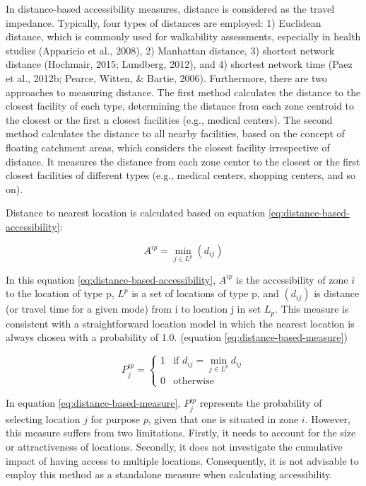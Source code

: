 \documentclass[
11pt, %
oneside, %
english, %
singlespacing, %
]{macthesis} %
\begin{document}
In distance-based accessibility measures, distance is considered as the travel impedance. Typically, four types of distances are employed: 1) Euclidean distance, which is commonly used for walkability assessments, especially in health studies (Apparicio et al., 2008), 2) Manhattan distance, 3) shortest network distance (Hochmair, 2015; Lundberg, 2012), and 4) shortest network time (Paez et al., 2012b; Pearce, Witten, \& Bartie, 2006). Furthermore, there are two approaches to measuring distance. The first method calculates the distance to the closest facility of each type, determining the distance from each zone centroid to the closest or the first n closest facilities (e.g., medical centers). The second method calculates the distance to all nearby facilities, based on the concept of floating catchment areas, which considers the closest facility irrespective of distance. It measures the distance from each zone center to the closest or the first closest facilities of different types (e.g., medical centers, shopping centers, and so on).

Distance to nearest location is calculated based on equation \eqref{eq:distance-based-accessibility}:

\begin{equation}
A^{ip} = \min_{j \in L^p} (d_{ij})
\label{eq:distance-based-accessibility}
\end{equation}

In this equation \eqref{eq:distance-based-accessibility}, \(A^{ip}\) is the accessibility of zone \(i\) to the location of type p, \(L^p\) is a set of locations of type p, and \((d_{ij})\) is distance (or travel time for a given mode) from i to location j in set \(L_p\). This measure is consistent with a straightforward location model in which the nearest location is always chosen with a probability of 1.0. (equation \eqref{eq:distance-based-measure})

\begin{equation}
P^{ip}_j = 
\begin{cases}
  1 & \text{if } d_{ij} = \min_{j \in L^p} d_{ij} \\
  0 & \text{otherwise}
\end{cases}
\label{eq:distance-based-measure}
\end{equation}

In equation \eqref{eq:distance-based-measure}, \(P_j^{ip}\) represents the probability of selecting location \(j\) for purpose \(p\), given that one is situated in zone \(i\). However, this measure suffers from two limitations. Firstly, it needs to account for the size or attractiveness of locations. Secondly, it does not investigate the cumulative impact of having access to multiple locations. Consequently, it is not advisable to employ this method as a standalone measure when calculating accessibility.
\end{document}
